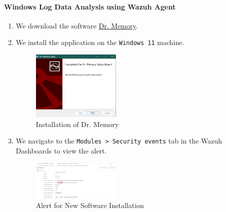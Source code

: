 \paragraph{Windows Log Data Analysis using Wazuh Agent}
\begin{enumerate}
    \item We download the software \href{https://drmemory.org}{Dr. Memory}.
    \item We install the application on the \texttt{Windows 11} machine.
    \begin{figure} [H]
    \centering
    \includegraphics[width=0.4\textwidth]{images/log-data/11.png}
    \caption{Installation of Dr. Memory}
    \end{figure}
    \item We navigate to the \texttt{Modules > Security events} tab in the Wazuh Dashboards to view the alert. 
    \begin{figure} [H]
    \centering
    \includegraphics[width=0.4\textwidth]{images/log-data/12.png}
    \caption{Alert for New Software Installation}
    \end{figure}
\end{enumerate}
